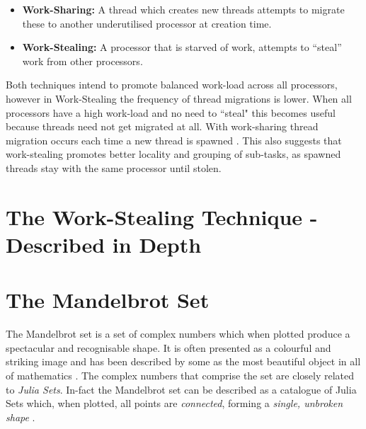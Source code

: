 \begin{itemize}
\item \textbf{Work-Sharing:} A thread which creates new threads attempts to migrate these to another underutilised processor at creation time. 
\item \textbf{Work-Stealing:} A processor that is starved of work, attempts to ``steal'' work from other processors. 
\end{itemize}

Both techniques intend to promote balanced work-load across all processors, however in Work-Stealing
the frequency of thread migrations is lower. When all processors have a 
high work-load and no need to ``steal" this becomes useful because threads need not get 
migrated at all. With work-sharing thread migration occurs each time a new thread is spawned \cite[p.~2]{blumleis}.
This also suggests that work-stealing promotes better locality and grouping of sub-tasks, as spawned threads stay with the same 
processor until stolen.



\section{The Work-Stealing Technique - Described in Depth}


\section{The Mandelbrot Set}

The Mandelbrot set is a set of complex numbers which when plotted produce a spectacular and recognisable shape.
It is often presented as a colourful and striking image and has been described by some as the most beautiful object in all of mathematics \cite[p.~234]{chaosfract}.
The complex numbers that comprise the set are closely related to \textit{Julia Sets}. 
In-fact the Mandelbrot set can be described as a catalogue of Julia Sets which, when plotted, all points are \textit{connected}, 
forming a \textit{single, unbroken shape} \cite[p.~177]{fractimg}.

